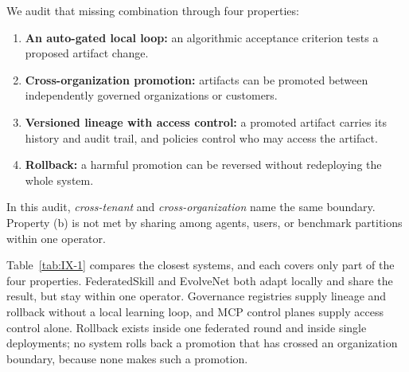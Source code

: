 We audit that missing combination through four properties:

\begin{enumerate}
\def\labelenumi{(\alph{enumi})}
\tightlist
\item
  \textbf{An auto-gated local loop:} an algorithmic acceptance criterion tests a proposed artifact change.
\item
  \textbf{Cross-organization promotion:} artifacts can be promoted between independently governed organizations or customers.
\item
  \textbf{Versioned lineage with access control:} a promoted artifact carries its history and audit trail, and policies control who may access the artifact.
\item
  \textbf{Rollback:} a harmful promotion can be reversed without redeploying the whole system.
\end{enumerate}

In this audit, \emph{cross-tenant} and \emph{cross-organization} name the same boundary. Property (b) is not met by sharing among agents, users, or benchmark partitions within one operator.

Table~\ref{tab:IX-1} compares the closest systems, and each covers only part of the four properties. FederatedSkill \cite{yang2026federatedskill} and EvolveNet \cite{nie2026evolvenet} both adapt locally and share the result, but stay within one operator. Governance registries supply lineage and rollback without a local learning loop, and MCP control planes supply access control alone. Rollback exists inside one federated round and inside single deployments; no system rolls back a promotion that has crossed an organization boundary, because none makes such a promotion.

